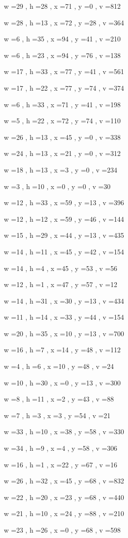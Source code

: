 \documentclass[11pt]{article}
\begin{document}
w =29 , h =28 , x =71 , y =0 , v =812
\par
w =28 , h =13 , x =72 , y =28 , v =364
\par
w =6 , h =35 , x =94 , y =41 , v =210
\par
w =6 , h =23 , x =94 , y =76 , v =138
\par
w =17 , h =33 , x =77 , y =41 , v =561
\par
w =17 , h =22 , x =77 , y =74 , v =374
\par
w =6 , h =33 , x =71 , y =41 , v =198
\par
w =5 , h =22 , x =72 , y =74 , v =110
\par
w =26 , h =13 , x =45 , y =0 , v =338
\par
w =24 , h =13 , x =21 , y =0 , v =312
\par
w =18 , h =13 , x =3 , y =0 , v =234
\par
w =3 , h =10 , x =0 , y =0 , v =30
\par
w =12 , h =33 , x =59 , y =13 , v =396
\par
w =12 , h =12 , x =59 , y =46 , v =144
\par
w =15 , h =29 , x =44 , y =13 , v =435
\par
w =14 , h =11 , x =45 , y =42 , v =154
\par
w =14 , h =4 , x =45 , y =53 , v =56
\par
w =12 , h =1 , x =47 , y =57 , v =12
\par
w =14 , h =31 , x =30 , y =13 , v =434
\par
w =11 , h =14 , x =33 , y =44 , v =154
\par
w =20 , h =35 , x =10 , y =13 , v =700
\par
w =16 , h =7 , x =14 , y =48 , v =112
\par
w =4 , h =6 , x =10 , y =48 , v =24
\par
w =10 , h =30 , x =0 , y =13 , v =300
\par
w =8 , h =11 , x =2 , y =43 , v =88
\par
w =7 , h =3 , x =3 , y =54 , v =21
\par
w =33 , h =10 , x =38 , y =58 , v =330
\par
w =34 , h =9 , x =4 , y =58 , v =306
\par
w =16 , h =1 , x =22 , y =67 , v =16
\par
w =26 , h =32 , x =45 , y =68 , v =832
\par
w =22 , h =20 , x =23 , y =68 , v =440
\par
w =21 , h =10 , x =24 , y =88 , v =210
\par
w =23 , h =26 , x =0 , y =68 , v =598
\par
\newpage
\end{document}
